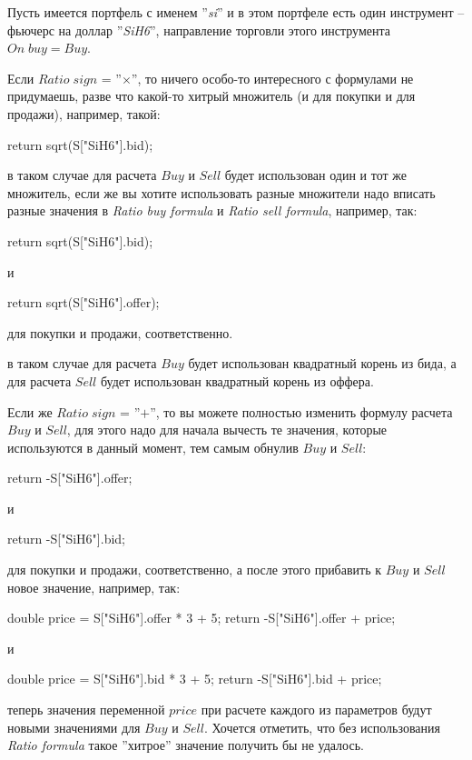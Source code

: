 Пусть имеется портфель с именем ''\textit{si}'' и в этом портфеле есть один инструмент -- фьючерс на доллар ''\textit{SiH6}'', направление торговли этого
инструмента $On \; buy = Buy$.

Если $Ratio \; sign$ = ''$\times$'', то ничего особо-то интересного с формулами не придумаешь, разве что какой-то хитрый множитель (и для покупки и для продажи), например, такой:
\begin{cpp}
return sqrt(S["SiH6"].bid);
\end{cpp}
в таком случае для расчета $Buy$ и $Sell$ будет использован один и тот же множитель, если же вы хотите использовать разные множители надо вписать разные значения
в \textit{Ratio buy formula} и \textit{Ratio sell formula}, например, так:
\begin{cpp}
return sqrt(S["SiH6"].bid);
\end{cpp}
и
\begin{cpp}
return sqrt(S["SiH6"].offer);
\end{cpp}
для покупки и продажи, соответственно.

в таком случае для расчета $Buy$ будет использован квадратный корень из бида, а для расчета $Sell$ будет использован квадратный корень из оффера.

Если же $Ratio \; sign$ = ''$+$'', то вы можете полностью изменить формулу расчета $Buy$ и $Sell$, для этого надо для начала вычесть те значения,
которые используются в данный момент, тем самым обнулив $Buy$ и $Sell$:
\begin{cpp}
return -S["SiH6"].offer;
\end{cpp}
и
\begin{cpp}
return -S["SiH6"].bid;
\end{cpp}
для покупки и продажи, соответственно, а после этого прибавить к $Buy$ и $Sell$ новое значение, например, так:
\begin{cpp}
double price = S["SiH6"].offer * 3 + 5;
return -S["SiH6"].offer + price;
\end{cpp}
и
\begin{cpp}
double price = S["SiH6"].bid * 3 + 5;
return -S["SiH6"].bid + price;
\end{cpp}
теперь значения переменной $price$ при расчете каждого из параметров будут новыми значениями для $Buy$ и $Sell$. Хочется отметить, что без использования \textit{Ratio formula}
такое ''хитрое'' значение получить бы не удалось.\newline

